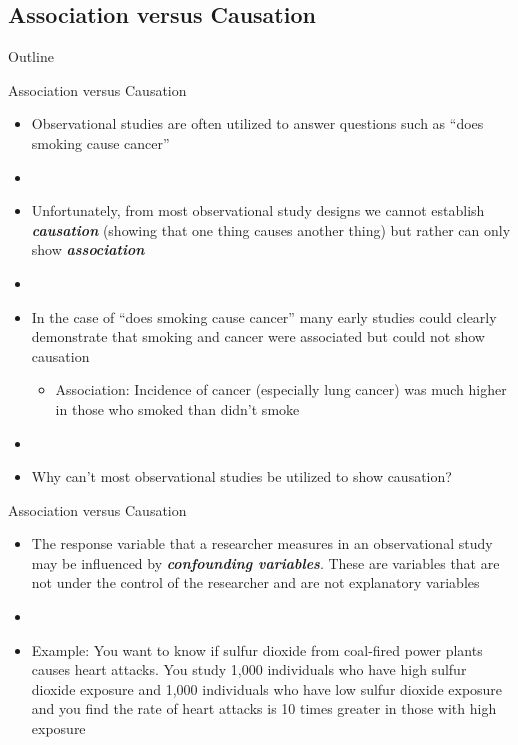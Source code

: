 \documentclass[xcolor=dvipsnames]{beamer}
\begin{document}
\subsection{Association versus Causation}
\begin{frame}{Outline}
\tableofcontents[currentsection,subsectionstyle=show/shaded/hide]
\end{frame}

\begin{frame}{Association versus Causation}
	\begin{itemize}
		\item Observational studies are often utilized to answer questions such as ``does smoking cause cancer'' \pause
		\item[]
		\item Unfortunately, from most observational study designs we cannot establish  \textbf{\emph{causation}} (showing that one thing causes another thing) but rather can only show \textbf{\emph{association}} \pause
		\item[]
		\item In the case of ``does smoking cause cancer'' many early studies could clearly demonstrate that smoking and cancer were associated but could not show causation 
		\begin{itemize}
			\item Association: Incidence of cancer (especially lung cancer) was much higher in those who smoked than didn't smoke \pause
		\end{itemize}
		\item[]
		\item Why can't most observational studies be utilized to show causation?
	\end{itemize}
\end{frame}

\begin{frame}{Association versus Causation}
	\begin{itemize}
		\item The response variable that a researcher measures in an observational study may be influenced by \textbf{\emph{confounding variables}}. These are variables that are not under the control of the researcher and are not explanatory variables \pause
		\item[]
		\item Example: You want to know if sulfur dioxide from coal-fired power plants causes heart attacks. You study 1,000 individuals who have high sulfur dioxide exposure and 1,000 individuals who have low sulfur dioxide exposure and you find the rate of heart attacks is 10 times greater in those with high exposure \pause
	\end{itemize}
\end{frame}
\end{document}
